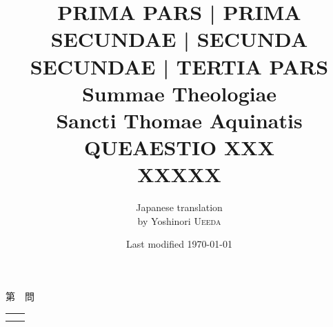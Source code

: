 \documentclass[paper=a4paper,fontsize=10pt,jafontsize=9pt,titlepage]{jlreq}
\title{{\bfseries PRIMA PARS | PRIMA SECUNDAE | SECUNDA SECUNDAE | TERTIA PARS}\\{\Huge Summae Theologiae}\\Sancti Thomae
Aquinatis\\{\sffamily QUEAESTIO XXX}\\XXXXX}
\author{Japanese translation\\by Yoshinori {\scshape Ueeda}}
\date{Last modified \today}
\begin{document}
\maketitle
\pagestyle{fancy}

\begin{center}
{\Large 第　問\\}
\end{center}

\begin{longtable}{p{21em}p{21em}}


&



\\



&

 

\end{longtable}

\newpage
\end{document}
